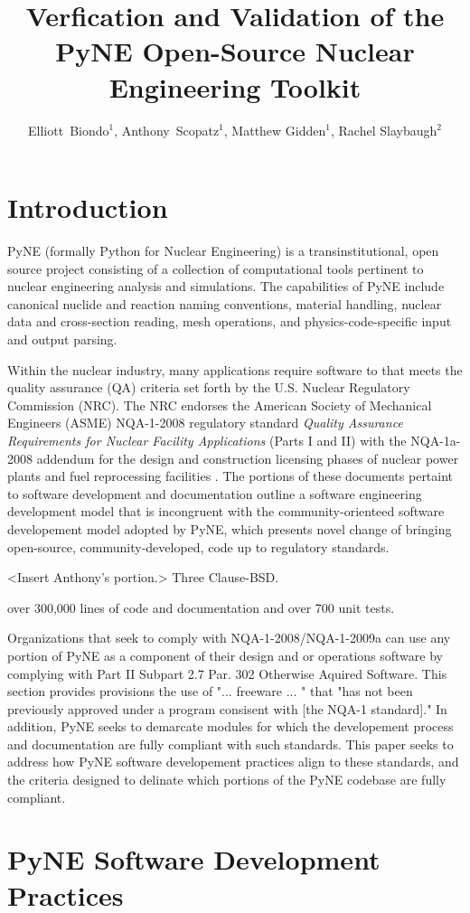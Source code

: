 \documentclass{anstrans}
\title{Verfication and Validation of the PyNE Open-Source Nuclear Engineering Toolkit}
\author{Elliott~Biondo$^{1}$, Anthony~Scopatz$^{1}$, Matthew Gidden$^{1}$, Rachel Slaybaugh$^{2}$}
\institute{
\and $^{1}$ The University of Wisconsin-Madison, 1500 Engineering Drive, Madison, WI 53706\\
\and $^{2}$ The University of California, Berkeley, 2521 Hearst Ave, Berkeley, CA 94709 \\
}
\begin{document}
\section{Introduction}

PyNE \cite{scopatz_pyne} (formally Python for Nuclear Engineering) is a
transinstitutional, open source project consisting of a collection of
computational tools pertinent to nuclear engineering analysis and simulations.
The capabilities of PyNE include canonical nuclide and reaction naming
conventions, material handling, nuclear data and cross-section reading, mesh
operations, and physics-code-specific input and output parsing. 

Within the nuclear industry, many applications require software to that meets
the quality assurance (QA) criteria set forth by the U.S. Nuclear Regulatory
Commission (NRC). The NRC endorses the American Society of Mechanical Engineers
(ASME) NQA-1-2008 regulatory standard \emph{Quality Assurance Requirements for
Nuclear Facility Applications} (Parts I and II) \cite{nrc} with the NQA-1a-2008
addendum \cite{add} for the design and construction licensing phases of nuclear
power plants and fuel reprocessing facilities \cite{nrc}. The portions of these
documents pertaint to software development and documentation outline a software
engineering development model that is incongruent with the community-orienteed
software developement model adopted by PyNE, which presents novel change of
bringing open-source, community-developed, code up to regulatory standards.

<Insert Anthony's portion.>
Three Clause-BSD.


over 300,000 lines of code and documentation and over 700 unit tests.


Organizations that seek to comply with NQA-1-2008/NQA-1-2009a can use any
portion of PyNE as a component of their design and or operations software by
complying with Part II Subpart 2.7 Par. 302 Otherwise Aquired Software. This
section provides provisions the use of "... freeware ... " that "has not been
previously approved under a program consisent with [the NQA-1 standard]." In
addition, PyNE seeks to demarcate modules for which the developement process
and documentation are fully compliant with such standards. This paper seeks to
address how PyNE software developement practices align to these standards, and
the criteria designed to delinate which portions of the PyNE codebase are fully
compliant.


\section{PyNE Software Development Practices}
\end{document}
